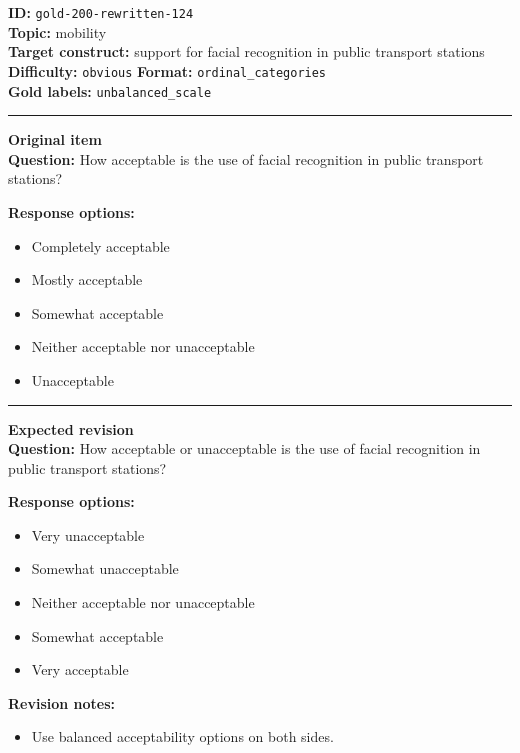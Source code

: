 \documentclass[10pt,a4paper]{article}
\newcommand{\sectionline}{\vspace{0.15em}\hrule\vspace{0.35em}}
\begin{document}
\begin{tcolorbox}[colframe=FlawRed,colback=white,colbacktitle=FlawRed!9,coltitle=black,title={Item 124\hfill Flawed item}]
\textbf{ID:} \texttt{gold-200-rewritten-124}\\
\textbf{Topic:} mobility\\
\textbf{Target construct:} support for facial recognition in public transport stations\\
\textbf{Difficulty:} \texttt{obvious} \quad \textbf{Format:} \texttt{ordinal\_categories}\\
\textbf{Gold labels:} \texttt{unbalanced\_scale}\\
\sectionline
\textbf{Original item}\\
\textbf{Question:} How acceptable is the use of facial recognition in public transport stations?
\par\textbf{Response options:}
\begin{itemize}
\item Completely acceptable
\item Mostly acceptable
\item Somewhat acceptable
\item Neither acceptable nor unacceptable
\item Unacceptable
\end{itemize}
\sectionline
\textbf{Expected revision}\\
\textbf{Question:} How acceptable or unacceptable is the use of facial recognition in public transport stations?
\par\textbf{Response options:}
\begin{itemize}
\item Very unacceptable
\item Somewhat unacceptable
\item Neither acceptable nor unacceptable
\item Somewhat acceptable
\item Very acceptable
\end{itemize}
\par\textbf{Revision notes:}
\begin{itemize}
\item Use balanced acceptability options on both sides.
\end{itemize}
\end{tcolorbox}
\end{document}
